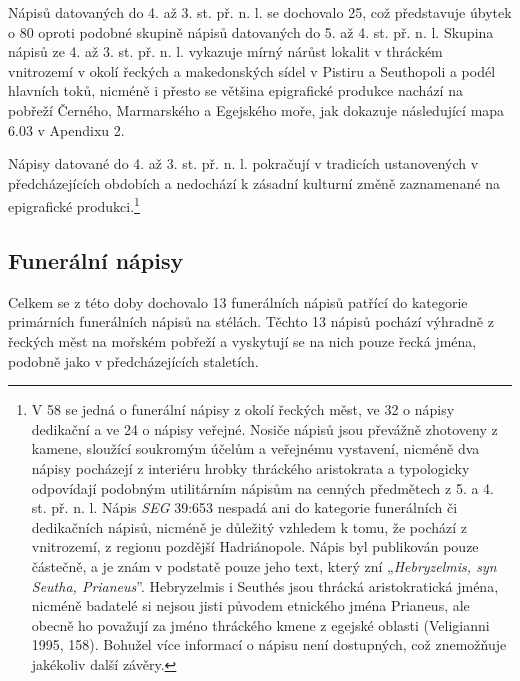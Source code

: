 \NC\AR
\HL
\HL
\stoptable

Nápisů datovaných do 4. až 3. st. př. n. l. se dochovalo 25, což představuje úbytek o 80  oproti podobné skupině nápisů datovaných do 5. až 4. st. př. n. l. Skupina nápisů ze 4. až 3. st. př. n. l. vykazuje mírný nárůst lokalit v thráckém vnitrozemí v okolí řeckých a makedonských sídel v Pistiru a Seuthopoli a podél hlavních toků, nicméně i přesto se většina epigrafické produkce nachází na pobřeží Černého, Marmarského a Egejského moře, jak dokazuje následující mapa 6.03 v Apendixu 2.

Nápisy datované do 4. až 3. st. př. n. l. pokračují v tradicích ustanovených v předcházejících obdobích a nedochází k zásadní kulturní změně zaznamenané na epigrafické produkci.\footnote{V 58  se jedná o funerální nápisy z okolí řeckých měst, ve 32  o nápisy dedikační a ve 24  o nápisy veřejné. Nosiče nápisů jsou převážně zhotoveny z kamene, sloužící soukromým účelům a veřejnému vystavení, nicméně dva nápisy pocházejí z interiéru hrobky thráckého aristokrata a typologicky odpovídají podobným utilitárním nápisům na cenných předmětech z 5. a 4. st. př. n. l. Nápis {\em SEG} 39:653 nespadá ani do kategorie funerálních či dedikačních nápisů, nicméně je důležitý vzhledem k tomu, že pochází z vnitrozemí, z regionu pozdější Hadriánopole. Nápis byl publikován pouze částečně, a je znám v podstatě pouze jeho text, který zní „{\em Hebryzelmis, syn Seutha, Prianeus}”. Hebryzelmis i Seuthés jsou thrácká aristokratická jména, nicméně badatelé si nejsou jisti původem etnického jména Prianeus, ale obecně ho považují za jméno thráckého kmene z egejské oblasti (Veligianni 1995, 158). Bohužel více informací o nápisu není dostupných, což znemožňuje jakékoliv další závěry.}

\subsection[funerální-nápisy-4]{Funerální nápisy}

Celkem se z této doby dochovalo 13 funerálních nápisů patřící do kategorie primárních funerálních nápisů na stélách. Těchto 13 nápisů pochází výhradně z řeckých měst na mořském pobřeží a vyskytují se na nich pouze řecká jména, podobně jako v předcházejících staletích.

